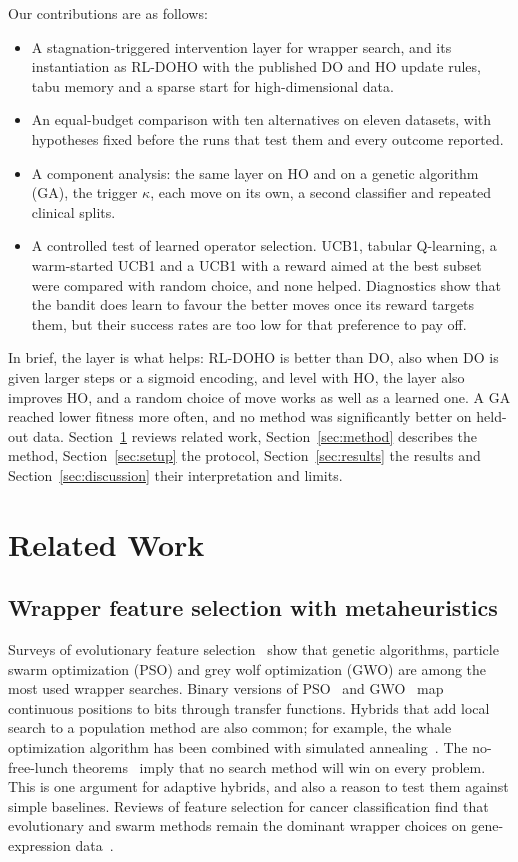 \documentclass[journal]{IEEEtran}
\begin{document}
Our contributions are as follows:
\begin{itemize}
\item A stagnation-triggered intervention layer for wrapper search, and its instantiation as RL-DOHO with the published DO and HO update rules, tabu memory and a sparse start for high-dimensional data.
\item An equal-budget comparison with ten alternatives on eleven datasets, with hypotheses fixed before the runs that test them and every outcome reported.
\item A component analysis: the same layer on HO and on a genetic algorithm (GA), the trigger $\kappa$, each move on its own, a second classifier and repeated clinical splits.
\item A controlled test of learned operator selection. UCB1, tabular Q-learning, a warm-started UCB1 and a UCB1 with a reward aimed at the best subset were compared with random choice, and none helped. Diagnostics show that the bandit does learn to favour the better moves once its reward targets them, but their success rates are too low for that preference to pay off.
\end{itemize}

In brief, the layer is what helps: RL-DOHO is better than DO, also when DO is given larger steps or a sigmoid encoding, and level with HO, the layer also improves HO, and a random choice of move works as well as a learned one. A GA reached lower fitness more often, and no method was significantly better on held-out data. Section~\ref{sec:related} reviews related work, Section~\ref{sec:method} describes the method, Section~\ref{sec:setup} the protocol, Section~\ref{sec:results} the results and Section~\ref{sec:discussion} their interpretation and limits.

\section{Related Work}\label{sec:related}

\subsection{Wrapper feature selection with metaheuristics}
Surveys of evolutionary feature selection~\cite{xue2016} show that genetic algorithms, particle swarm optimization (PSO) and grey wolf optimization (GWO) are among the most used wrapper searches. Binary versions of PSO~\cite{kennedy1997} and GWO~\cite{mirjalili2014gwo,emary2016bgwo} map continuous positions to bits through transfer functions. Hybrids that add local search to a population method are also common; for example, the whale optimization algorithm has been combined with simulated annealing~\cite{mafarja2017}. The no-free-lunch theorems~\cite{wolpert1997} imply that no search method will win on every problem. This is one argument for adaptive hybrids, and also a reason to test them against simple baselines. Reviews of feature selection for cancer classification find that evolutionary and swarm methods remain the dominant wrapper choices on gene-expression data~\cite{ramadhani2025}.
\end{document}
